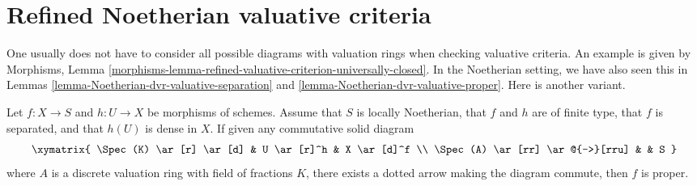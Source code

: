 \section{Refined Noetherian valuative criteria}
\label{section-refined-valuative-criteria}

\noindent
One usually does not have to consider all possible diagrams with
valuation rings when checking valuative criteria. An example is
given by Morphisms, Lemma
\ref{morphisms-lemma-refined-valuative-criterion-universally-closed}.
In the Noetherian setting, we have also seen this in
Lemmas \ref{lemma-Noetherian-dvr-valuative-separation} and
\ref{lemma-Noetherian-dvr-valuative-proper}. Here is another variant.

\begin{lemma}
\label{lemma-refined-valuative-criterion-proper}
Let $f : X \to S$ and $h : U \to X$ be morphisms of schemes.
Assume that $S$ is locally Noetherian, that $f$ and $h$ are of finite type,
that $f$ is separated, and that $h(U)$ is dense in $X$.
If given any commutative solid diagram
$$
\xymatrix{
\Spec(K) \ar[r] \ar[d] & U \ar[r]^h & X \ar[d]^f \\
\Spec(A) \ar[rr] \ar@{-->}[rru] & & S
}
$$
where $A$ is a discrete valuation ring with field of fractions $K$, there
exists a dotted arrow making the diagram commute, then $f$ is proper.
\end{lemma}

